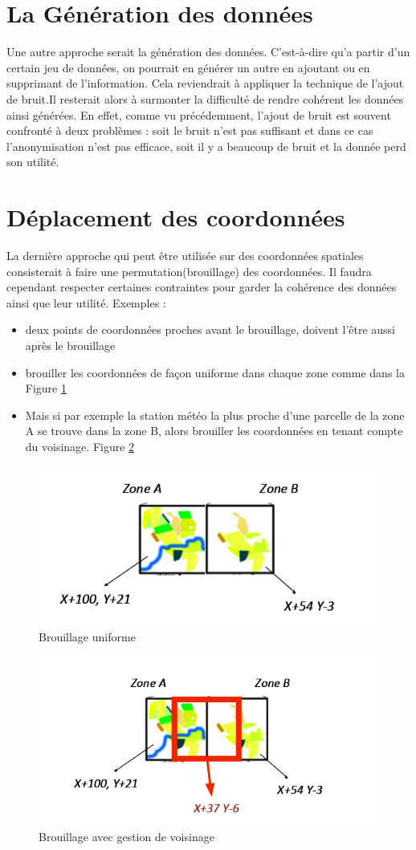 \section{La Génération des données}
Une autre approche serait la génération des données. C'est-à-dire qu'a partir d'un certain jeu de données, on pourrait en générer un autre en ajoutant ou en supprimant de l'information. Cela reviendrait à appliquer la technique de l'ajout de bruit.Il resterait alors à surmonter la difficulté de rendre cohérent les données ainsi générées. En effet, comme vu précédemment, l'ajout de bruit est souvent confronté à deux problèmes : soit le bruit n'est pas suffisant et dans ce cas l'anonymisation n'est pas efficace, soit il y a beaucoup de bruit et la donnée perd son utilité.
\section{Déplacement des coordonnées}
 La dernière approche qui peut être utilisée sur des coordonnées spatiales consisterait à faire une permutation(brouillage) des coordonnées. Il faudra cependant respecter certaines contraintes pour garder la cohérence des données ainsi que leur utilité. Exemples : 
 \begin{itemize}
     \item deux points de coordonnées proches avant le brouillage, doivent l'être aussi après le brouillage
     \item brouiller les coordonnées de façon uniforme dans chaque zone comme dans la Figure \ref{fig:Brouillage uniforme}
     \item Mais si par exemple la station météo la plus proche d’une parcelle de la zone A se trouve dans la zone B, alors brouiller les coordonnées en tenant compte du voisinage. Figure \ref{fig:Brouillage avec gestion de voisinage}
 \end{itemize}
 
 \begin{figure}[!h]
    \centering
    \includegraphics[width=.5\textwidth]{images/anonymisation/brouillage_image1.png}
    \caption{ Brouillage uniforme}
    \label{fig:Brouillage uniforme}
\end{figure}
\begin{figure}[!h]
    \centering
    \includegraphics[width=.5\textwidth]{images/anonymisation/brouillage_image2.png}
    \caption{ Brouillage avec gestion de voisinage}
    \label{fig:Brouillage avec gestion de voisinage}
\end{figure}
